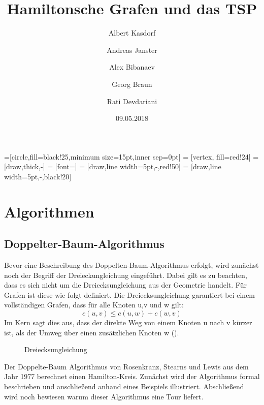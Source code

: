 \documentclass{article}
\title{Hamiltonsche Grafen und das TSP}
\author{
  Albert Kasdorf\and
  Andreas Janster\and
  Alex Bibanaev\and
  Georg Braun\and
  Rati Devdariani}
\date{09.05.2018}
\begin{document}
=[circle,fill=black!25,minimum size=15pt,inner sep=0pt]
 = [vertex, fill=red!24]
 = [draw,thick,-]
 = [font=\small]
 = [draw,line width=5pt,-,red!50]
 = [draw,line width=5pt,-,black!20]

\maketitle

\section{Algorithmen}

\subsection{Doppelter-Baum-Algorithmus}
Bevor eine Beschreibung des Doppelten-Baum-Algorithmus erfolgt, wird zunächst noch der Begriff der Dreieckungleichung eingeführt. Dabei gilt es zu beachten, dass es sich nicht um die Dreiecksungleichung aus der Geometrie handelt. Für Grafen ist diese wie folgt definiert.
Die Dreiecksungleichung garantiert bei einem vollständigen Grafen, dass für alle Knoten u,v und w gilt:
\begin{displaymath}
c(u,v) \leq c(u,w) + c(w,v)
\end{displaymath}
Im Kern sagt dies aus, dass der direkte Weg von einem Knoten u nach v kürzer ist, als der Umweg über einen zusätzlichen Knoten w ().
\begin{figure}[H]
\centering
{}
\caption{Dreiecksungleichung}
\label{fig:dreiecksungleichung}
\end{figure}


Der Doppelte-Baum Algorithmus von Rosenkranz, Stearns und Lewis aus dem Jahr 1977 berechnet einen Hamilton-Kreis. Zunächst wird der Algorithmus formal beschrieben und anschließend anhand eines Beispiels illustriert. Abschließend wird noch bewiesen warum dieser Algorithmus eine Tour liefert.
\end{document}
